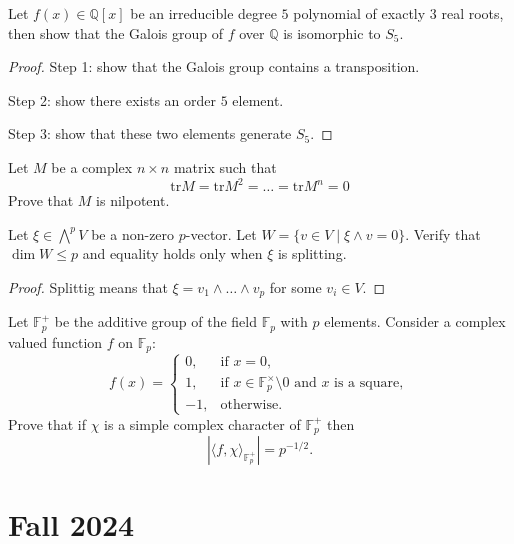 \documentclass[openany]{book}
\newcommand{\tr}{\text{tr}}
\newcommand{\Q}{\mathbb{Q}}
\begin{document}
\begin{prob}[Q3]
    Let $f(x)\in\Q[x]$ be an irreducible degree $5$ polynomial of exactly $3$ real roots, then show that the Galois group of $f$ over $\Q$ is isomorphic to $S_5$.
\end{prob}
\begin{proof}
    Step 1: show that the Galois group contains a transposition.
    
    Step 2: show there exists an order $5$ element.

    Step 3: show that these two elements generate $S_5$.
\end{proof}



\begin{prob}[Q4]
    Let $M$ be a complex $n\times n$ matrix such that 
    \begin{equation*}
        \tr M=\tr M^2=\dots=\tr M^n=0
    \end{equation*}
    Prove that $M$ is nilpotent.
\end{prob}



\begin{prob}[Q5]
    Let \( \xi \in \bigwedge^p V \) be a non-zero \( p \)-vector. Let \( W = \{ v \in V \mid \xi \land v = 0 \} \). Verify that \(\dim W \leq p\) and equality holds only when \( \xi \) is splitting.
\end{prob}
\begin{proof}
    Splittig means that $\xi=v_1\wedge\dots\wedge v_p$ for some $v_i\in V$.
\end{proof}


\begin{prob}[Q6]
    Let \( \mathbb{F}_p^+ \) be the additive group of the field \( \mathbb{F}_p \) with \( p \) elements. Consider a complex valued function \( f \) on \( \mathbb{F}_p \):
\[
f(x) =
\begin{cases}
0, & \text{if } x = 0, \\
1, & \text{if } x \in \mathbb{F}_p^\times \setminus 0 \text{ and } x \text{ is a square}, \\
-1, & \text{otherwise}.
\end{cases}
\]
Prove that if \( \chi \) is a simple complex character of \( \mathbb{F}_p^+ \) then
\[
\left| \langle f, \chi \rangle_{\mathbb{F}_p^+} \right| = p^{-1/2}.
\]
\end{prob}

\chapter{Fall 2024}
\end{document}

